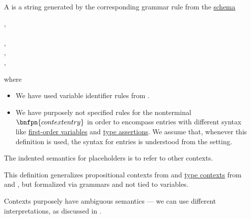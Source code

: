 \begin{definition}\label{def:logical_context}\mimprovised
  A  is a string generated by the corresponding grammar rule from the \hyperref[def:formal_grammar/schema]{schema}
  \begin{bnf*}
     {}, \\
        { \bnfor {} \bnfor} \\
    , \\
           {\bnfves}, \\
                 { \bnfor {}},
  \end{bnf*}
  where
  \begin{itemize}
    \item We have used variable identifier rules from .

    \item We have purposely not specified rules for the nonterminal \( \bnfpn{context entry} \) in order to encompass entries with different syntax like \hyperref[def:first_order_syntax/var]{first-order variables} and \hyperref[def:type_assertion]{type assertions}. We assume that, whenever this definition is used, the syntax for entries is understood from the setting.
  \end{itemize}
\end{definition}
\begin{comments}
  \item The indented semantics for placeholders is to refer to other contexts.

  \item This definition generalizes propositional contexts from \cite[45]{Mimram2020ProgramEqualsProof} and \hyperref[def:type_context]{type contexts} from \cite[159]{Mimram2020ProgramEqualsProof} and \cite[def. 2A5]{Hindley1997BasicSTT}, but formalized via grammars and not tied to variables.

  \item Contexts purposely have ambiguous semantics --- we can use different interpretations, as discussed in .
\end{comments}

